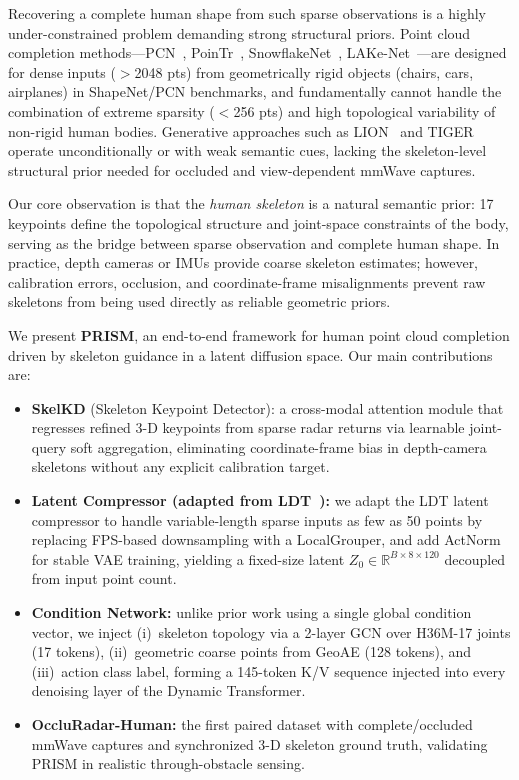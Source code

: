 \documentclass{article}
\newcommand{\Rbb}{\mathbb{R}}
\begin{document}
Recovering a complete human shape from such sparse observations is a
highly under-constrained problem demanding strong structural priors.
Point cloud completion methods---PCN~\cite{pcn}, PoinTr~\cite{pointr},
SnowflakeNet~\cite{snowflake}, LAKe-Net~\cite{lakenet}---are designed for
dense inputs ($>$2048 pts) from geometrically rigid objects (chairs, cars,
airplanes) in ShapeNet/PCN benchmarks, and fundamentally cannot handle the
combination of extreme sparsity ($<$256 pts) and high topological variability
of non-rigid human bodies.
Generative approaches such as LION~\cite{lion} and TIGER~\cite{tiger} operate
unconditionally or with weak semantic cues, lacking the skeleton-level structural
prior needed for occluded and view-dependent mmWave captures.

Our core observation is that the \emph{human skeleton} is a natural semantic
prior: 17 keypoints define the topological structure and joint-space constraints
of the body, serving as the bridge between sparse observation and complete human
shape.
In practice, depth cameras or IMUs provide coarse skeleton estimates; however,
calibration errors, occlusion, and coordinate-frame misalignments prevent raw
skeletons from being used directly as reliable geometric priors.

We present \textbf{PRISM}, an end-to-end framework for human point cloud
completion driven by skeleton guidance in a latent diffusion space.
Our main contributions are:
\begin{itemize}[leftmargin=1.5em,itemsep=1pt]
  \item \textbf{SkelKD} (Skeleton Keypoint Detector): a cross-modal attention
        module that regresses refined 3-D keypoints from sparse radar returns via
        learnable joint-query soft aggregation, eliminating coordinate-frame bias
        in depth-camera skeletons without any explicit calibration target.
  \item \textbf{Latent Compressor (adapted from LDT~\cite{ldt}):} we adapt the
        LDT latent compressor to handle variable-length sparse inputs as few as
        50 points by replacing FPS-based downsampling with a LocalGrouper, and
        add ActNorm for stable VAE training, yielding a fixed-size latent
        $Z_0\!\in\!\Rbb^{B\times8\times120}$ decoupled from input point count.
  \item \textbf{Condition Network:} unlike prior work using a single
        global condition vector, we inject (i)~skeleton topology via a 2-layer
        GCN over H36M-17 joints (17 tokens), (ii)~geometric coarse points from
        GeoAE (128 tokens), and (iii)~action class label, forming a
        145-token K/V sequence injected into every denoising layer of the
        Dynamic Transformer.
  \item \textbf{OccluRadar-Human:} the first paired dataset with
        complete/occluded mmWave captures and synchronized 3-D skeleton ground
        truth, validating PRISM in realistic through-obstacle sensing.
\end{itemize}
\end{document}
